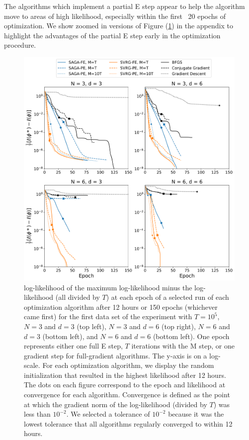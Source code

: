The algorithms which implement a partial E step appear to help the algorithm move to areas of high likelihood, especially within the first ~20 epochs of optimization. We show zoomed in versions of Figure (\ref{fig:ll_trace_sim}) in the appendix to highlight the advantages of the partial E step early in the optimization procedure.
%
\begin{figure}
    \centering
    \includegraphics[width=6.5in]{../plt/log-like_v_epoch_T-100000-000.png}
    \caption{log-likelihood of the maximum log-likelihood minus the log-likelihood (all divided by $T$) at each epoch of a selected run of each optimization algorithm after 12 hours or 150 epochs (whichever came first) for the first data set of the experiment with $T=10^{5}$, $N=3$ and $d=3$ (top left), $N=3$ and $d=6$ (top right), $N=6$ and $d=3$ (bottom left), and $N=6$ and $d=6$ (bottom left). One epoch represents either one full E step, $T$ iterations with the M step, or one gradient step for full-gradient algorithms. The y-axis is on a log-scale. For each optimization algorithm, we display the random initialization that resulted in the highest likelihood after 12 hours. The dots on each figure correspond to the epoch and likelihood at convergence for each algorithm. Convergence is defined as the point at which the gradient norm of the log-likelihood (divided by $T$) was less than $10^{-2}$. We selected a tolerance of $10^{-2}$ because it was the lowest tolerance that all algorithms regularly converged to within 12 hours.}
    \label{fig:ll_trace_sim}
\end{figure}

